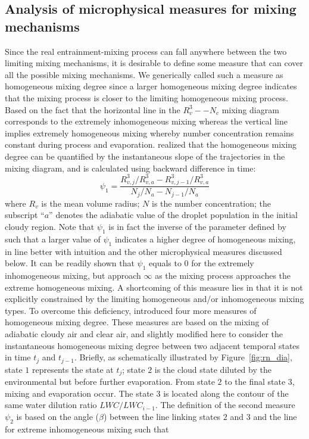 \documentclass[draft,linenumbers]{agujournal}
\newcommand{\Fig}[1]{Figure~\ref{#1}}
\begin{document}
\subsection{Analysis of microphysical measures for mixing mechanisms}
Since the real entrainment-mixing process can fall anywhere between the two limiting mixing mechanisms, it is desirable to define some measure that can cover all the possible mixing mechanisms. We generically called such a measure as homogeneous mixing degree since a larger homogeneous mixing degree indicates that the mixing process is closer to the limiting homogeneous mixing process. Based on the fact that the horizontal line in the $R_v^3−-N_c$ mixing diagram corresponds to the extremely inhomogeneous mixing whereas the vertical line implies extremely homogeneous mixing {\color{green} whereby number concentration remains constant during process and evaporation. \citet{And09} realized that} the homogeneous mixing degree can be quantified by the instantaneous slope of the trajectories in the mixing diagram, and is calculated using backward difference in time: 
\begin{equation}
\psi_1 = \frac{R_{v,j}^3/R_{v,a}^3 - R_{v,j-1}^3/R_{v,a}^3}{N_{j}/N_a - N_{j-1}/N_a}
\label{phi1}
\end{equation}
where $R_v$ is the mean volume radius; $N$ is the number concentration; the subscript ``$a$'' denotes the adiabatic value of the droplet population in the initial cloudy region. Note that $\psi_1$ is in fact the inverse of the parameter defined by \citet{And09} such that a larger value of $\psi_1$ indicates a higher degree of homogeneous mixing, in line better with intuition and the other microphysical measures discussed below. It can be readily shown that $\psi_1$ equals to $0$ for the extremely inhomogeneous mixing, but approach $\infty$ as the mixing process approaches the extreme homogeneous mixing. A shortcoming of this measure lies in that it is not explicitly constrained by the limiting homogeneous and/or inhomogeneous mixing types. To overcome this deficiency, \citet{Lu2013a, Lu2013b, Lu2014} introduced four more measures of homogeneous mixing degree. These measures are based on the mixing of adiabatic cloudy air and clear air, and slightly modified here to consider the instantaneous homogeneous mixing degree between two adjacent 
temporal states in time $t_j$ and $t_{j-1}$. 
{\color{green} Briefly, as schematically illustrated by \Fig{fig:rn_dia}, state $1$ represents the state at $t_j$; state $2$ is the cloud state diluted by the environmental but before further evaporation. From state $2$ to the final state $3$, mixing and evaporation occur. The state $3$ is located along the contour of the same water dilution ratio $LWC/LWC_{i-1}$. The definition of the second measure $\psi_2$ is based on the angle ($\beta$) between the line linking states $2$ and $3$ and the line for extreme inhomogeneous mixing such that}
\end{document}
